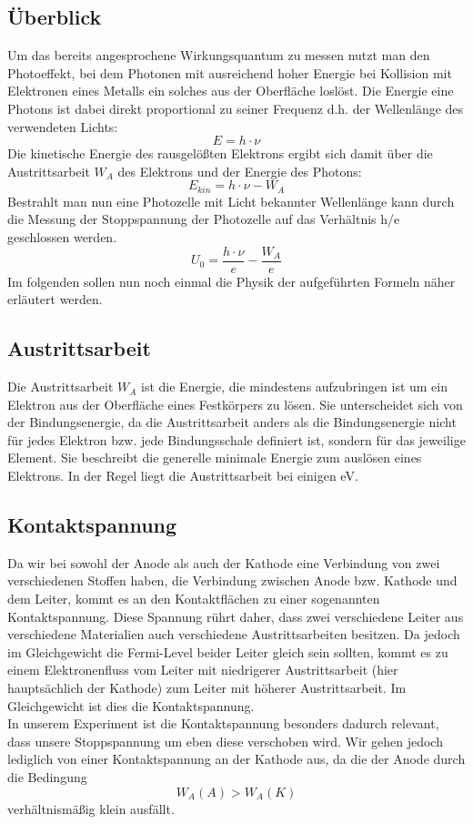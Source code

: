 \documentclass{scrartcl}
\begin{document}
	\subsection{Überblick}
		Um das bereits angesprochene Wirkungsquantum zu messen nutzt man den Photoeffekt, bei dem 
		Photonen mit ausreichend hoher Energie bei Kollision mit Elektronen eines Metalls ein solches 
		aus der Oberfläche loslöst. Die Energie eine Photons ist dabei direkt proportional zu seiner Frequenz d.h. der 
		Wellenlänge des verwendeten Lichts:
		\begin{equation}
			E = h \cdot \nu
		\end{equation}
		Die kinetische Energie des rausgelößten Elektrons ergibt sich damit über die 
		Austrittsarbeit $W_A$ des Elektrons und der Energie des Photons:
		\begin{equation}
			E_{kin} = h \cdot \nu - W_A
		\end{equation}
		Bestrahlt man nun eine Photozelle mit Licht bekannter Wellenlänge kann durch die Messung der 
		Stoppspannung der Photozelle auf das Verhältnis h/e geschlossen werden.
		\begin{equation}
			U_0 = \frac{h\cdot \nu}{e} - \frac{W_A}{e}
		\end{equation}
		Im folgenden sollen nun noch einmal die Physik der aufgeführten Formeln näher erläutert werden.
	\subsection{Austrittsarbeit}
		Die Austrittsarbeit $W_A$ ist die Energie, die mindestens aufzubringen ist um ein Elektron aus 
		der Oberfläche eines Festkörpers zu lösen. Sie unterscheidet sich von der Bindungsenergie, da 
		die Austrittsarbeit anders als die Bindungsenergie nicht für jedes Elektron bzw. jede Bindungsschale definiert
		ist, sondern für das jeweilige Element. Sie beschreibt die generelle minimale Energie zum auslösen eines Elektrons.
		In der Regel liegt die Austrittsarbeit bei einigen eV.
	\subsection{Kontaktspannung}
		Da wir bei sowohl der Anode als auch der Kathode eine Verbindung von zwei verschiedenen Stoffen haben, die Verbindung
		zwischen Anode bzw. Kathode und dem Leiter, kommt es an den Kontaktflächen zu einer sogenannten Kontaktspannung.
		Diese Spannung rührt daher, dass zwei verschiedene Leiter aus verschiedene Materialien auch verschiedene Austrittsarbeiten
		besitzen. Da jedoch im Gleichgewicht die Fermi-Level beider Leiter gleich sein sollten, kommt es zu einem Elektronenfluss
		vom Leiter mit niedrigerer Austrittsarbeit (hier hauptsächlich der Kathode) zum Leiter mit höherer Austrittsarbeit. Im Gleichgewicht
		ist dies die Kontaktspannung.\\
		In unserem Experiment ist die Kontaktspannung besonders dadurch relevant, dass unsere Stoppspannung um eben diese verschoben wird. Wir gehen jedoch
		lediglich von einer Kontaktspannung an der Kathode aus, da die der Anode durch die Bedingung
		\begin{equation}
			W_A(A) > W_A(K)
		\end{equation}
		verhältnismäßig klein ausfällt.
\end{document}
